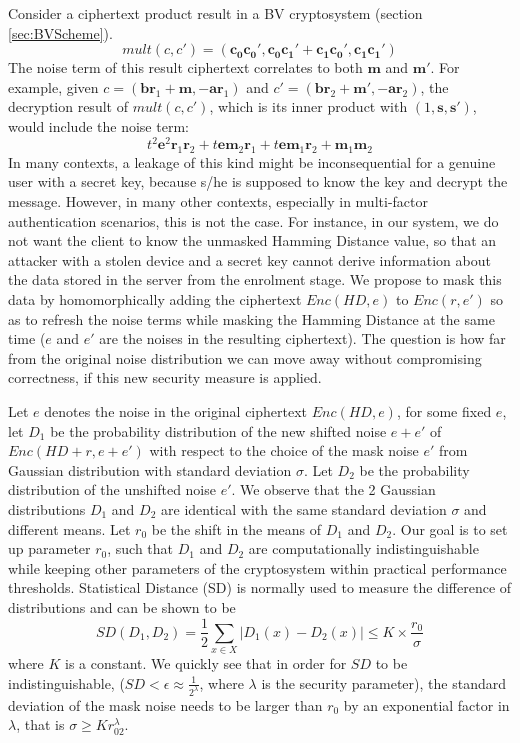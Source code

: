 Consider a ciphertext product result in a BV cryptosystem (section
\ref{sec:BVScheme}).
\[
  mult(c,c') = (\mathbf{c_0}\mathbf{c_0'}, \mathbf{c_0}\mathbf{c_1'} +
  \mathbf{c_1}\mathbf{c_0'}, \mathbf{c_1}\mathbf{c_1'})
\]
The noise term of this result ciphertext correlates to both $\mathbf{m}$ and
$\mathbf{m}'$. For example, given
$c = (\mathbf{b}\mathbf{r}_{1} + \mathbf{m}, -\mathbf{a}\mathbf{r}_{1})$ and $c' = (\mathbf{b}\mathbf{r}_{2} + \mathbf{m}', -\mathbf{a}\mathbf{r}_{2})$, the decryption result of $mult(c,c')$, which is its inner product with $(1,\mathbf{s}, \mathbf{s}')$, would include the noise term:
\[
t^{2}\mathbf{e}^{2}\mathbf{r}_{1}\mathbf{r}_{2} + t\mathbf{e}\mathbf{m}_{2}\mathbf{r}_{1} + t\mathbf{e}\mathbf{m}_{1}\mathbf{r}_{2} + \mathbf{m}_{1}\mathbf{m}_{2}
\]
In many
contexts, a leakage of this kind might be inconsequential for a genuine user
with a secret key, because s/he is supposed to know the key and decrypt the
message.  However, in many other contexts, especially in multi-factor
authentication scenarios, this is not the case. For instance, in our system, we
do not want the client to know the unmasked Hamming Distance value, so that an
attacker with a stolen device and a secret key cannot derive information about
the data stored in the server from the enrolment stage. We propose to mask this
data by homomorphically adding the ciphertext $Enc(HD, e)$ to $Enc(r, e')$ so as to
refresh the noise terms while masking the Hamming Distance at the same time ($e$ and $e'$ are the noises in the resulting ciphertext). The
question is how far from the original noise distribution we can move away
without compromising correctness, if this new security measure is applied.

Let $e$ denotes the noise in the original ciphertext $Enc(HD,e)$, for some fixed $e$, let $D_{1}$ be the probability distribution of the new shifted noise $e + e'$ of $Enc(HD + r, e + e')$ with respect to the choice of the mask noise $e'$ from Gaussian distribution with standard deviation $\sigma$. Let $D_{2}$ be the probability distribution of the unshifted noise $e'$. We observe that the
2 Gaussian distributions $D_{1}$ and $D_{2}$ are identical with the same standard deviation
$\sigma$ and different means. Let $r_0$ be the shift in the means of $D_1$ and $D_2$.
Our goal is to set up parameter $r_0$, such that $D_1$ and $D_2$ are computationally
indistinguishable while keeping other parameters of the cryptosystem within practical
performance
thresholds. Statistical Distance (SD) is normally used to measure the difference of distributions and can be shown to be
\[
SD(D_1, D_2) = \frac{1}{2}\sum_{x\in X}|D_1(x) - D_2(x)| \leq K\times \frac{r_0}
{\sigma}
\]
where $K$ is a constant. We quickly see that in order for $SD$ to be indistinguishable, ($SD < \epsilon \approx \frac{1}{2^\lambda}$, where $\lambda$ is
the security parameter), the standard deviation of the mask noise needs to be larger than $r_{0}$ by an exponential factor in $\lambda$, that is $\sigma \geq Kr_02^\lambda$.

